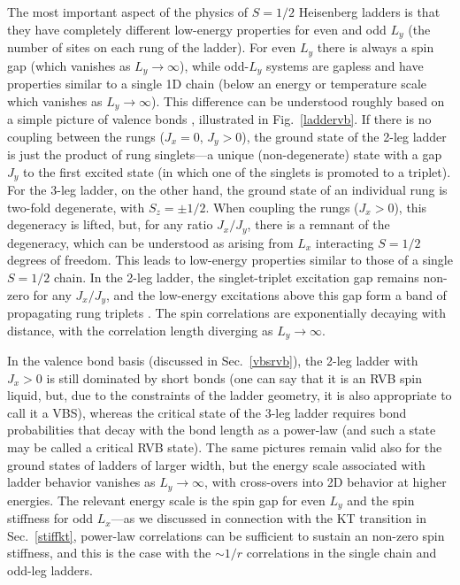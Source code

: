 \documentclass[draft,numberedheadings]{aipproc}
\begin{document}
The most important aspect of the physics of $S=1/2$ Heisenberg ladders is that they have completely different low-energy properties for even and odd $L_y$ (the
number of sites on each rung of the ladder). For even $L_y$ there is always a spin gap (which vanishes as $L_y \to \infty$), while odd-$L_y$ systems are gapless
and have properties similar to a single 1D chain (below an energy or temperature scale which vanishes as $L_y \to \infty$). This difference can be understood roughly 
based on a simple picture of valence bonds \cite{white94}, illustrated in Fig.~\ref{laddervb}. If there is no coupling between the rungs ($J_x=0$, $J_y>0$), 
the ground state of the 2-leg ladder is just the product of rung singlets---a unique (non-degenerate) state with a gap $J_y$ to the first excited state (in
which one of the singlets is promoted to a triplet). For the 3-leg ladder, on the other hand, the ground state of an individual rung is two-fold degenerate, 
with $S_z=\pm 1/2$. When coupling the rungs ($J_x>0$), this degeneracy is lifted, but, for any ratio $J_x/J_y$, there is a remnant of the degeneracy, which 
can be understood as arising from $L_x$ interacting $S=1/2$ degrees of freedom. This leads to low-energy properties similar to those of a single $S=1/2$ chain. 
In the 2-leg ladder, the singlet-triplet excitation gap remains non-zero for any $J_x/J_y$, and the low-energy excitations above this gap form a band of 
propagating rung triplets \cite{troyer94}. The spin correlations are exponentially decaying with distance, with the correlation length diverging as $L_y \to \infty$. 

In the valence bond basis (discussed in Sec.~\ref{vbsrvb}), the 2-leg ladder with $J_x>0$ is still dominated by short bonds (one can say that it is an RVB spin 
liquid, but, due to the constraints of the ladder geometry, it is also appropriate to call it a VBS), whereas the critical state of the 3-leg ladder 
requires bond probabilities that decay with the bond length as a power-law \cite{white94} (and such a state may be called a critical RVB state). The same 
pictures remain valid also for the ground states of ladders of larger width, but the energy scale associated with ladder behavior vanishes as $L_y \to \infty$, 
with cross-overs into 2D behavior at higher energies. The relevant energy scale is the spin gap for even $L_y$ and the spin stiffness for odd $L_x$---as we 
discussed in connection with the KT transition in Sec.~\ref{stiffkt}, power-law correlations can be sufficient to sustain an non-zero spin stiffness, and
this is the case with the $\sim 1/r$ correlations in the single chain and odd-leg ladders.
\end{document}
